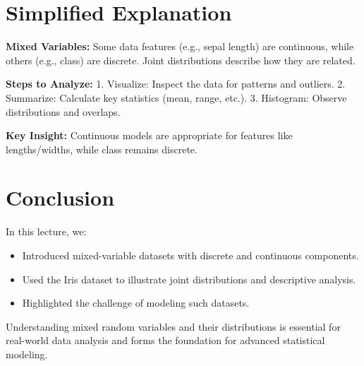 \documentclass{article}
\begin{document}
\section*{Simplified Explanation}

\textbf{Mixed Variables:}
Some data features (e.g., sepal length) are continuous, while others (e.g., class) are discrete. Joint distributions describe how they are related.

\textbf{Steps to Analyze:}
1. Visualize: Inspect the data for patterns and outliers.
2. Summarize: Calculate key statistics (mean, range, etc.).
3. Histogram: Observe distributions and overlaps.

\textbf{Key Insight:}
Continuous models are appropriate for features like lengths/widths, while class remains discrete.

\section*{Conclusion}

In this lecture, we:
\begin{itemize}
  \item Introduced mixed-variable datasets with discrete and continuous components.
  \item Used the Iris dataset to illustrate joint distributions and descriptive analysis.
  \item Highlighted the challenge of modeling such datasets.
\end{itemize}

Understanding mixed random variables and their distributions is essential for real-world data analysis and forms the foundation for advanced statistical modeling.
\end{document}
